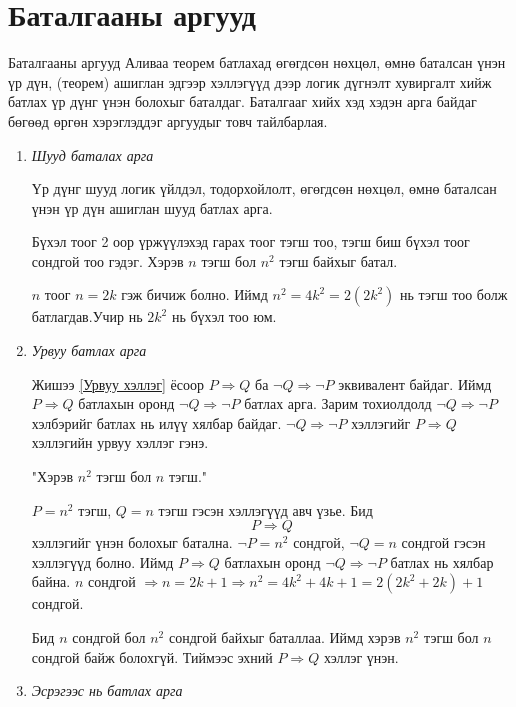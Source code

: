 \section{Баталгааны аргууд}
\begin{frame}[allowframebreaks]{Баталгааны аргууд}
Аливаа теорем батлахад өгөгдсөн нөхцөл, өмнө баталсан үнэн үр дүн, (теорем) ашиглан эдгээр хэллэгүүд дээр логик дүгнэлт хувиргалт хийж батлах үр дүнг үнэн болохыг баталдаг. Баталгааг хийх хэд хэдэн арга байдаг бөгөөд өргөн хэрэглэддэг аргуудыг товч тайлбарлая.
\begin{enumerate}
    \item \it{Шууд баталах арга}
    
    Үр дүнг шууд логик үйлдэл, тодорхойлолт, өгөгдсөн нөхцөл, өмнө баталсан үнэн үр дүн ашиглан шууд батлах арга.
\begin{example}
Бүхэл тоог 2 оор үржүүлэхэд гарах тоог тэгш тоо, тэгш биш бүхэл тоог сондгой тоо гэдэг. Хэрэв $n$ тэгш бол $n^2$ тэгш байхыг батал. 
\begin{solution}
$n$ тоог $n=2k$ гэж бичиж болно. Иймд $n^2=4k^2=2(2k^2)$ нь тэгш тоо болж батлагдав.Учир нь $2k^2$ нь бүхэл тоо юм.
\end{solution}
\end{example}
\item \it{Урвуу батлах арга} 

Жишээ \ref{Урвуу хэллэг} ёсоор $P\Rightarrow Q$ ба  $\lnot Q\Rightarrow \lnot P$ эквивалент байдаг. Иймд $P\Rightarrow Q$ батлахын оронд $\lnot Q\Rightarrow \lnot P$ батлах арга. Зарим тохиолдолд $\lnot Q\Rightarrow \lnot P$ хэлбэрийг батлах нь илүү хялбар байдаг. $\lnot Q\Rightarrow \lnot P$ хэллэгийг $P\Rightarrow Q$ хэллэгийн урвуу хэллэг гэнэ.
\begin{example}
"Хэрэв $n^2$ тэгш бол $n$ тэгш." 
\begin{solution} $P=n^2$ тэгш, $Q=n$ тэгш гэсэн хэллэгүүд авч үзье. Бид $$P\Rightarrow Q$$ хэллэгийг үнэн болохыг батална. $\lnot P=n^2$ сондгой, $\lnot Q=n$ сондгой гэсэн хэллэгүүд болно. Иймд $P\Rightarrow Q$ батлахын оронд $\lnot Q\Rightarrow \lnot P$ батлах нь хялбар байна.
$n$ сондгой $\Rightarrow n=2k+1\Rightarrow n^2=4k^2+4k+1=2(2k^2+2k)+1$ сондгой. 

Бид $n$ сондгой бол  $n^2$ сондгой байхыг баталлаа. Иймд хэрэв $n^2$ тэгш бол $n$ сондгой байж болохгүй. Тиймээс эхний $P\Rightarrow Q$ хэллэг үнэн.
\end{solution}
\end{example}
\item \it{Эсрэгээс нь батлах арга} 


\end{enumerate}
\end{frame}
